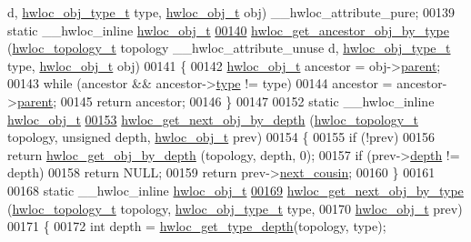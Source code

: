 \begin{DoxyCode}
      d, \hyperlink{a00041_gacd37bb612667dc437d66bfb175a8dc55}{hwloc_obj_type_t} type, \hyperlink{a00016}{hwloc_obj_t} obj) \_\_hwloc\_attribute\_pure;
00139 \textcolor{keyword}{static} \_\_hwloc\_inline \hyperlink{a00016}{hwloc_obj_t}
\hypertarget{a00031_source_l00140}{}\hyperlink{a00053_gac93e1a95a71add57ac841daef1b94e5e}{00140} \hyperlink{a00053_gac93e1a95a71add57ac841daef1b94e5e}{hwloc_get_ancestor_obj_by_type} (\hyperlink{a00039_ga9d1e76ee15a7dee158b786c30b6a6e38}{hwloc_topology_t} topology \_\_hwloc\_attribute\_unuse
      d, \hyperlink{a00041_gacd37bb612667dc437d66bfb175a8dc55}{hwloc_obj_type_t} type, \hyperlink{a00016}{hwloc_obj_t} obj)
00141 \{
00142   \hyperlink{a00016}{hwloc_obj_t} ancestor = obj->\hyperlink{a00016_adc494f6aed939992be1c55cca5822900}{parent};
00143   \textcolor{keywordflow}{while} (ancestor && ancestor->\hyperlink{a00016_acc4f0803f244867e68fe0036800be5de}{type} != type)
00144     ancestor = ancestor->\hyperlink{a00016_adc494f6aed939992be1c55cca5822900}{parent};
00145   \textcolor{keywordflow}{return} ancestor;
00146 \}
00147 
00152 \textcolor{keyword}{static} \_\_hwloc\_inline \hyperlink{a00016}{hwloc_obj_t}
\hypertarget{a00031_source_l00153}{}\hyperlink{a00053_gab7c1dce3f42ece5bfa621e87cf332418}{00153} \hyperlink{a00053_gab7c1dce3f42ece5bfa621e87cf332418}{hwloc_get_next_obj_by_depth} (\hyperlink{a00039_ga9d1e76ee15a7dee158b786c30b6a6e38}{hwloc_topology_t} topology, \textcolor{keywordtype}{unsigned} depth, 
      \hyperlink{a00016}{hwloc_obj_t} prev)
00154 \{
00155   \textcolor{keywordflow}{if} (!prev)
00156     \textcolor{keywordflow}{return} \hyperlink{a00047_gaedd78240b0c1108355586a268ec5a697}{hwloc_get_obj_by_depth} (topology, depth, 0);
00157   \textcolor{keywordflow}{if} (prev->\hyperlink{a00016_a9d82690370275d42d652eccdea5d3ee5}{depth} != depth)
00158     \textcolor{keywordflow}{return} NULL;
00159   \textcolor{keywordflow}{return} prev->\hyperlink{a00016_a85a788017457129589318b6c39451acf}{next_cousin};
00160 \}
00161 
00168 \textcolor{keyword}{static} \_\_hwloc\_inline \hyperlink{a00016}{hwloc_obj_t}
\hypertarget{a00031_source_l00169}{}\hyperlink{a00053_ga5f08ceb69375341e73563cfe2e77534e}{00169} \hyperlink{a00053_ga5f08ceb69375341e73563cfe2e77534e}{hwloc_get_next_obj_by_type} (\hyperlink{a00039_ga9d1e76ee15a7dee158b786c30b6a6e38}{hwloc_topology_t} topology, \hyperlink{a00041_gacd37bb612667dc437d66bfb175a8dc55}{hwloc_obj_type_t} type,
00170                    \hyperlink{a00016}{hwloc_obj_t} prev)
00171 \{
00172   \textcolor{keywordtype}{int} depth = \hyperlink{a00046_gaea7c64dd59467f5201ba87712710b14d}{hwloc_get_type_depth}(topology, type);

\end{DoxyCode}
